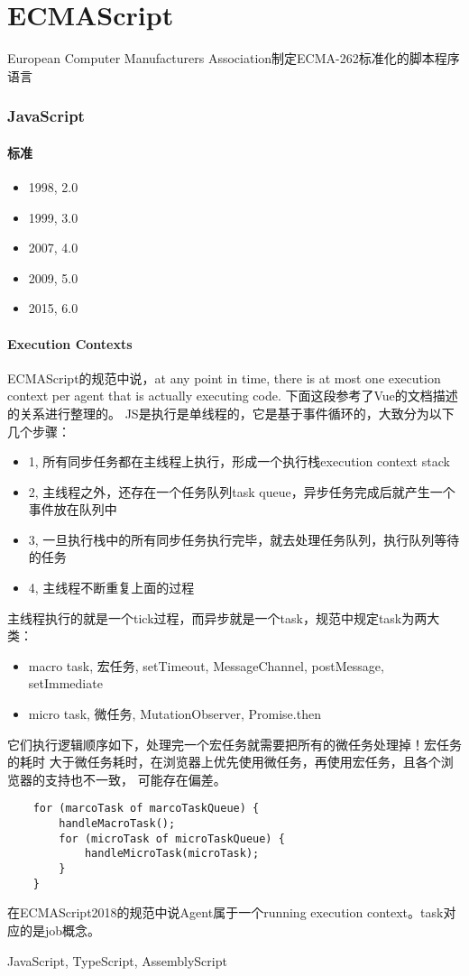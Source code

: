 \clearpage
\part{ECMAScript}

European Computer Manufacturers Association制定ECMA-262标准化的脚本程序语言

\section{JavaScript}

\subsection{标准}
\begin{itemize}
    \item {1998, 2.0}
    \item {1999, 3.0}
    \item {2007, 4.0}
    \item {2009, 5.0}
    \item {2015, 6.0}
\end{itemize}

\subsection{Execution Contexts}
ECMAScript的规范中说，at any point in time, there is at most one execution context per agent
that is actually executing code.
下面这段参考了Vue的文档描述的关系进行整理的。
JS是执行是单线程的，它是基于事件循环的，大致分为以下几个步骤：
\begin{itemize}
    \item {1, 所有同步任务都在主线程上执行，形成一个执行栈execution context stack}
    \item {2, 主线程之外，还存在一个任务队列task queue，异步任务完成后就产生一个事件放在队列中}
    \item {3, 一旦执行栈中的所有同步任务执行完毕，就去处理任务队列，执行队列等待的任务}
    \item {4, 主线程不断重复上面的过程}
\end{itemize}
主线程执行的就是一个tick过程，而异步就是一个task，规范中规定task为两大类：
\begin{itemize}
    \item {macro task, 宏任务, setTimeout, MessageChannel, postMessage, setImmediate}
    \item {micro task, 微任务, MutationObserver, Promise.then}
\end{itemize}
它们执行逻辑顺序如下，处理完一个宏任务就需要把所有的微任务处理掉！宏任务的耗时
大于微任务耗时，在浏览器上优先使用微任务，再使用宏任务，且各个浏览器的支持也不一致，
可能存在偏差。
\begin{lstlisting}
    for (marcoTask of marcoTaskQueue) {
        handleMacroTask();
        for (microTask of microTaskQueue) {
            handleMicroTask(microTask);
        }
    }
\end{lstlisting}
在ECMAScript2018的规范中说Agent属于一个running execution context。task对应的是job概念。

JavaScript, TypeScript, AssemblyScript

